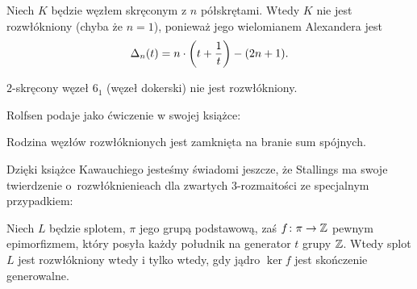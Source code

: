 \begin{example}
%
    Niech $K$ będzie węzłem skręconym z $n$ półskrętami.
    Wtedy $K$ nie jest rozwłókniony (chyba że $n = 1$), ponieważ jego wielomianem Alexandera jest
%
    \begin{equation}
        \Delta_n(t) = n \cdot \left(t + \frac 1 t \right) - (2n+1).
    \end{equation}
\end{example}

\begin{corollary}
    $2$-skręcony węzeł $6_1$ (węzeł dokerski) nie jest rozwłókniony.
\end{corollary}

Rolfsen \cite[s. 326]{rolfsen1976} podaje jako ćwiczenie w swojej książce:

\begin{proposition}
%
    Rodzina węzłów rozwłóknionych jest zamknięta na branie sum spójnych.
\end{proposition}

Dzięki książce Kawauchiego \cite[s. 84]{kawauchi1996} jesteśmy świadomi jeszcze, że Stallings ma swoje twierdzenie o~rozwłóknienieach dla zwartych 3-rozmaitości ze specjalnym przypadkiem:
%
\begin{proposition}
    Niech $L$ będzie splotem, $\pi$ jego grupą podstawową, zaś $f \colon \pi \to \mathbb Z$ pewnym epimorfizmem, który posyła każdy południk na generator $t$ grupy $\mathbb Z$. %
    Wtedy splot $L$ jest rozwłókniony wtedy i tylko wtedy, gdy jądro $\ker f$ jest skończenie generowalne.
\end{proposition}

%


